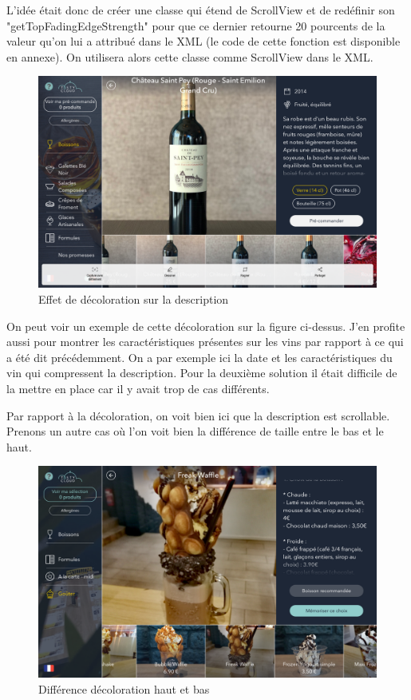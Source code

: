 L'idée était donc de créer une classe qui étend de ScrollView et de redéfinir son "getTopFadingEdgeStrength" pour que ce dernier retourne 20 pourcents de la valeur qu'on lui a attribué dans le XML (le code de cette fonction est disponible en annexe). On utilisera alors cette classe comme ScrollView dans le XML.

\clearpage

\begin{figure}[!htb]
  \centering
  \includegraphics[width=115mm,scale=0.5]{images/scroll2.png}
  \caption{Effet de décoloration sur la description}
  \label{fig:boat1}
\end{figure}

On peut voir un exemple de cette décoloration sur la figure ci-dessus. J'en profite aussi pour montrer les caractéristiques présentes sur les vins par rapport à ce qui a été dit précédemment. On a par exemple ici la date et les caractéristiques du vin qui compressent la description. Pour la deuxième solution il était difficile de la mettre en place car il y avait trop de cas différents.

Par rapport à la décoloration, on voit bien ici que la description est scrollable. Prenons un autre cas où l'on voit bien la différence de taille entre le bas et le haut.

\begin{figure}[!htb]
  \centering
  \includegraphics[width=115mm,scale=0.5]{images/scroll3.png}
  \caption{Différence décoloration haut et bas}
  \label{fig:boat1}
\end{figure}

